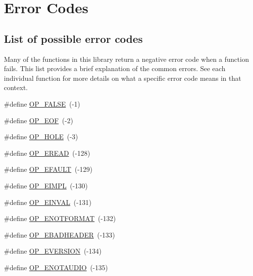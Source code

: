 \hypertarget{group__error__codes}{}\section{Error Codes}
\label{group__error__codes}
\subsection*{List of possible error codes}
\label{_amgrpacecf4314d910b089a039a9e23f42c77}%
Many of the functions in this library return a negative error code when a function fails. This list provides a brief explanation of the common errors. See each individual function for more details on what a specific error code means in that context. \begin{DoxyCompactItemize}
\item 
\#define \mbox{\hyperlink{group__error__codes_ga4fd28e64a5cbe5e0ba163916199611a5}{O\+P\+\_\+\+F\+A\+L\+SE}}~(-\/1)
\item 
\#define \mbox{\hyperlink{group__error__codes_ga3fdffc8ee880969d99fc862d53c0efd2}{O\+P\+\_\+\+E\+OF}}~(-\/2)
\item 
\#define \mbox{\hyperlink{group__error__codes_ga2ac03d35986d3505305d468dd2138b72}{O\+P\+\_\+\+H\+O\+LE}}~(-\/3)
\item 
\#define \mbox{\hyperlink{group__error__codes_ga3ad48a4f99b1bed72acec552296dfc08}{O\+P\+\_\+\+E\+R\+E\+AD}}~(-\/128)
\item 
\#define \mbox{\hyperlink{group__error__codes_ga2ddb887c0bb55c74ea6be391fabcba59}{O\+P\+\_\+\+E\+F\+A\+U\+LT}}~(-\/129)
\item 
\#define \mbox{\hyperlink{group__error__codes_gaeea27378f826033ca23584d8403665d3}{O\+P\+\_\+\+E\+I\+M\+PL}}~(-\/130)
\item 
\#define \mbox{\hyperlink{group__error__codes_gae0879acafe9cc0ab72462d291fdb6fb6}{O\+P\+\_\+\+E\+I\+N\+V\+AL}}~(-\/131)
\item 
\#define \mbox{\hyperlink{group__error__codes_gafca3ae244d24e10b2851c77379453220}{O\+P\+\_\+\+E\+N\+O\+T\+F\+O\+R\+M\+AT}}~(-\/132)
\item 
\#define \mbox{\hyperlink{group__error__codes_ga534f1b45c8733a2928434e482b38869f}{O\+P\+\_\+\+E\+B\+A\+D\+H\+E\+A\+D\+ER}}~(-\/133)
\item 
\#define \mbox{\hyperlink{group__error__codes_gaa9ae4494f623f3c0609f0b4bd99b8f32}{O\+P\+\_\+\+E\+V\+E\+R\+S\+I\+ON}}~(-\/134)
\item 
\#define \mbox{\hyperlink{group__error__codes_ga3a2a6cb4837030d240f326e17dda3c0e}{O\+P\+\_\+\+E\+N\+O\+T\+A\+U\+D\+IO}}~(-\/135)

\end{DoxyCompactItemize}
